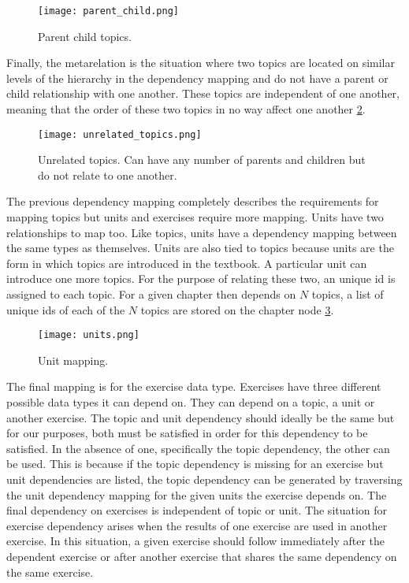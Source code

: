 \begin{figure}[ht]
    \centering
    \texttt{[image: parent\_child.png]}
    \caption[parent child topic.]{Parent child topics.}

    \label{fig:parent_child}
\end{figure}

Finally, the metarelation is the situation where two topics are located on similar levels of the hierarchy in the dependency mapping and do not have a parent or child relationship with one another. These topics are independent of one another, meaning that the order of these two topics in no way affect one another \ref{fig:unrelated_topics}.

\pagebreak
\begin{figure}[ht]
    \centering
    \texttt{[image: unrelated\_topics.png]}
    \caption[Unrelated topics.]{Unrelated topics. Can have any number of parents and children but do not relate to one another.}
        
    \label{fig:unrelated_topics}
\end{figure}

The previous dependency mapping completely describes the requirements for mapping topics but units and exercises require more mapping. Units have two relationships to map too. Like topics, units have a dependency mapping between the same types as themselves. Units are also tied to topics because units are the form in which topics are introduced in the textbook. A particular unit can introduce one more topics. For the purpose of relating these two, an unique id is assigned to each topic. For a given chapter then depends on $N$ topics, a list of unique ids of each of the $N$ topics are stored on the chapter node \ref{fig:units}.

\begin{figure}[ht]
    \centering
    \texttt{[image: units.png]}
    \caption[Unit mapping.]{Unit mapping.}
        
    \label{fig:units}
\end{figure}

The final mapping is for the exercise data type. Exercises have three different possible data types it can depend on. They can depend on a topic, a unit or another exercise. The topic and unit dependency should ideally be the same but for our purposes, both must be satisfied in order for this dependency to be satisfied. In the absence of one, specifically the topic dependency, the other can be used. This is because if the topic dependency is missing for an exercise but unit dependencies are listed, the topic dependency can be generated by traversing the unit dependency mapping for the given units the exercise depends on. The final dependency on exercises is independent of topic or unit. The situation for exercise dependency arises when the results of one exercise are used in another exercise. In this situation, a given exercise should follow immediately after the dependent exercise or after another exercise that shares the same dependency on the same exercise.


